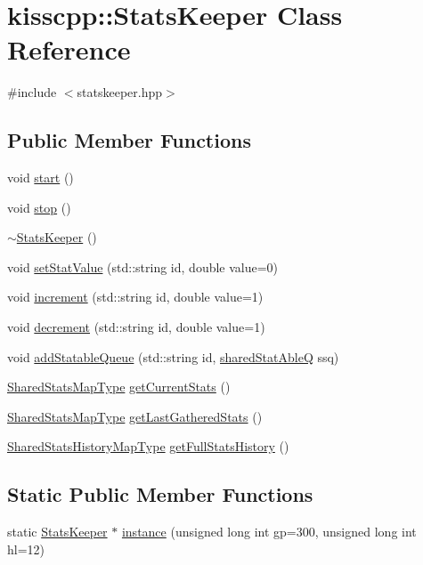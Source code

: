 \hypertarget{a00042}{\section{kisscpp\-:\-:Stats\-Keeper Class Reference}
\label{a00042}
}


{\ttfamily \#include $<$statskeeper.\-hpp$>$}

\subsection*{Public Member Functions}
\begin{DoxyCompactItemize}
\item 
void \hyperlink{a00042_a1d75a31af13458128e88afaf95280357}{start} ()
\item 
void \hyperlink{a00042_a4f6a639706fc26b421bc9ab2f0ef9ca0}{stop} ()
\item 
\hyperlink{a00042_adc9c6986efc28efc5198f579c3093a6f}{$\sim$\-Stats\-Keeper} ()
\item 
void \hyperlink{a00042_abea7ffc45ac76e92dc2cf9db86040336}{set\-Stat\-Value} (std\-::string id, double value=0)
\item 
void \hyperlink{a00042_a1d7da29c8056a6280eeb54371f1a7ac3}{increment} (std\-::string id, double value=1)
\item 
void \hyperlink{a00042_ae41c3d5bc4373f271ae773f81f3f294a}{decrement} (std\-::string id, double value=1)
\item 
void \hyperlink{a00042_ab7899e972216b5c6281db4cfd7d2be0d}{add\-Statable\-Queue} (std\-::string id, \hyperlink{a00089_a141592ccd82280d2692ca3b9b490faab}{shared\-Stat\-Able\-Q} ssq)
\item 
\hyperlink{a00089_aec223e8bce5f3988c62ceb0ccad11a68}{Shared\-Stats\-Map\-Type} \hyperlink{a00042_a031493a516bae72e9b56ccf52d93ed5e}{get\-Current\-Stats} ()
\item 
\hyperlink{a00089_aec223e8bce5f3988c62ceb0ccad11a68}{Shared\-Stats\-Map\-Type} \hyperlink{a00042_a6352b48ba6b6e4122ba0f1c28a5a581c}{get\-Last\-Gathered\-Stats} ()
\item 
\hyperlink{a00089_afa626c76d3dca5d5e1be4146f211fefa}{Shared\-Stats\-History\-Map\-Type} \hyperlink{a00042_a4678b93e4ba79c70ddefaf8d22994ed3}{get\-Full\-Stats\-History} ()
\end{DoxyCompactItemize}
\subsection*{Static Public Member Functions}
\begin{DoxyCompactItemize}
\item 
static \hyperlink{a00042}{Stats\-Keeper} $\ast$ \hyperlink{a00042_a78b5744a055b105990c0ba433a8cfec7}{instance} (unsigned long int gp=300, unsigned long int hl=12)
\end{DoxyCompactItemize}


